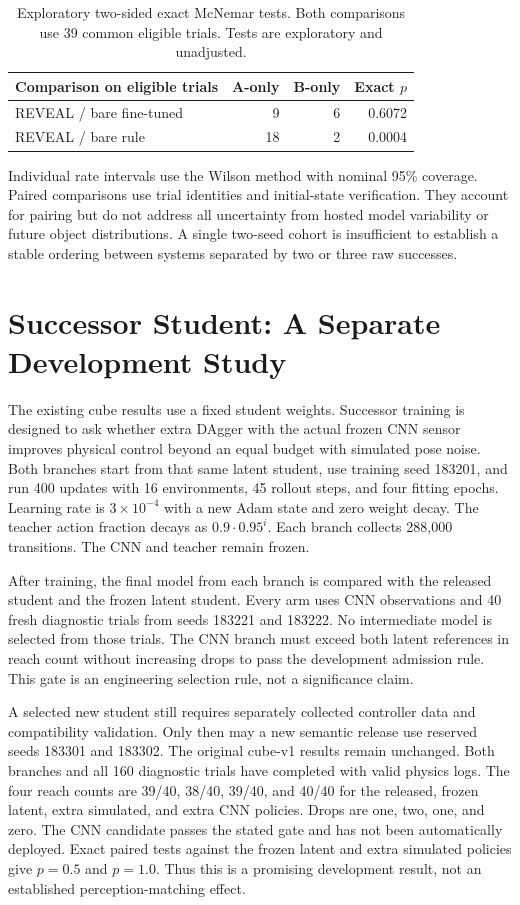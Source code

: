 \begin{table}[h]
\centering\small
\begin{tabular}{lrrr}
\toprule
Comparison on eligible trials & A-only & B-only & Exact $p$\\
\midrule
REVEAL / bare fine-tuned & 9 & 6 & 0.6072\\
REVEAL / bare rule & 18 & 2 & 0.0004\\
\bottomrule
\end{tabular}
\caption{Exploratory two-sided exact McNemar tests. Both comparisons use 39 common eligible trials. Tests are exploratory and unadjusted.}
\end{table}

Individual rate intervals use the Wilson method with nominal 95\% coverage. Paired comparisons use trial identities and initial-state verification. They account for pairing but do not address all uncertainty from hosted model variability or future object distributions. A single two-seed cohort is insufficient to establish a stable ordering between systems separated by two or three raw successes.

\section{Successor Student: A Separate Development Study}
The existing cube results use a fixed student weights. Successor training is designed to ask whether extra DAgger with the actual frozen CNN sensor improves physical control beyond an equal budget with simulated pose noise. Both branches start from that same latent student, use training seed 183201, and run 400 updates with 16 environments, 45 rollout steps, and four fitting epochs. Learning rate is $3\times10^{-4}$ with a new Adam state and zero weight decay. The teacher action fraction decays as $0.9\cdot0.95^i$. Each branch collects 288,000 transitions. The CNN and teacher remain frozen.

After training, the final model from each branch is compared with the released student and the frozen latent student. Every arm uses CNN observations and 40 fresh diagnostic trials from seeds 183221 and 183222. No intermediate model is selected from those trials. The CNN branch must exceed both latent references in reach count without increasing drops to pass the development admission rule. This gate is an engineering selection rule, not a significance claim.

A selected new student still requires separately collected controller data and compatibility validation. Only then may a new semantic release use reserved seeds 183301 and 183302. The original cube-v1 results remain unchanged. Both branches and all 160 diagnostic trials have completed with valid physics logs. The four reach counts are 39/40, 38/40, 39/40, and 40/40 for the released, frozen latent, extra simulated, and extra CNN policies. Drops are one, two, one, and zero. The CNN candidate passes the stated gate and has not been automatically deployed. Exact paired tests against the frozen latent and extra simulated policies give $p=0.5$ and $p=1.0$. Thus this is a promising development result, not an established perception-matching effect.

